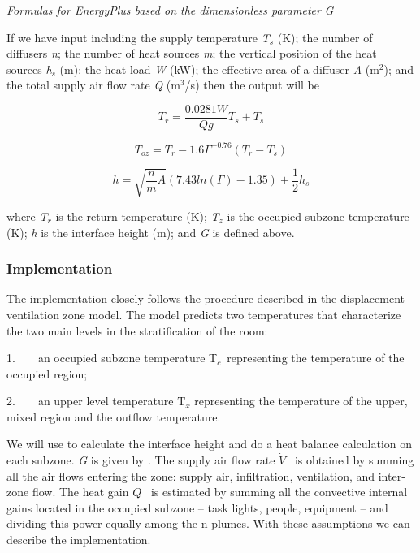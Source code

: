 \emph{Formulas for EnergyPlus based on the dimensionless parameter} \emph{G}

If we have input including the supply temperature \emph{T\(_{s}\)} (K); the number of diffusers \emph{n}; the number of heat sources \emph{m}; the vertical position of the heat sources \emph{h\(_{s}\)} (m); the heat load \emph{W} (kW); the effective area of a diffuser \emph{A} (m\(^{2}\)); and the total supply air flow rate \emph{Q} (m\(^{3}\)/s) then the output will be

\begin{equation}
{T_r} = \frac{{0.0281W}}{{Qg}}{T_s} + {T_s}
\end{equation}

\begin{equation}
{T_{oz}} = {T_r} - 1.6{\Gamma ^{ - 0.76}}({T_r} - {T_s})
\end{equation}

\begin{equation}
h = \sqrt {\frac{n}{m}A} (7.43ln(\Gamma ) - 1.35) + \frac{1}{2}{h_s}
\end{equation}

where \emph{T\(_{r}\)} is the return temperature (K); \emph{T\(_{z}\)} is the occupied subzone temperature (K); \emph{h} is the interface height (m); and \emph{G} is defined above.

\subsubsection{Implementation}\label{implementation-1}

The implementation closely follows the procedure described in the displacement ventilation zone model. The model predicts two temperatures that characterize the two main levels in the stratification of the room:

1.~~~~an occupied subzone temperature T\(_{c}\)~representing the temperature of the occupied region;

2.~~~~an upper level temperature T\(_{x}\) representing the temperature of the upper, mixed region and the outflow temperature.

We will use to calculate the interface height and do a heat balance calculation on each subzone. \emph{G} is given by . The supply air flow rate \(\dot V\) ~is obtained by summing all the air flows entering the zone: supply air, infiltration, ventilation, and inter-zone flow. The heat gain \(\dot Q\) ~is estimated by summing all the convective internal gains located in the occupied subzone -- task lights, people, equipment -- and dividing this power equally among the n plumes. With these assumptions we can describe the implementation.

